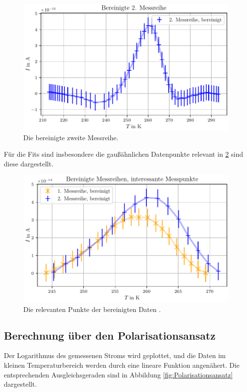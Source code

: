 \begin{figure}[H]
    \centering
    \includegraphics[width=\textwidth]{plots/E_messreihe2_bereinigt.pdf}
    \caption{Die bereinigte zweite Messreihe.}
    \label{fig:Bereinigt2}
\end{figure}

Für die Fits sind insbesondere die gaußähnlichen Datenpunkte relevant in \ref{fig:Vergleich} sind diese dargestellt.

\begin{figure}[H]
    \centering
    \includegraphics[width=\textwidth]{plots/F_messreihen_bereinigt_relevantepunkte.pdf}
    \caption{Die relevanten Punkte der bereinigten Daten .}
    \label{fig:Vergleich}
\end{figure}

\subsection{Berechnung über den Polarisationsansatz}
Der Logarithmus des gemessenen Stroms wird geplottet, und die Daten im kleinen Temperaturbereich werden
durch eine lineare Funktion angenähert. Die entsprechenden Ausgleichsgeraden sind in Abbildung \ref{fig:Polarisationsansatz} dargestellt.

